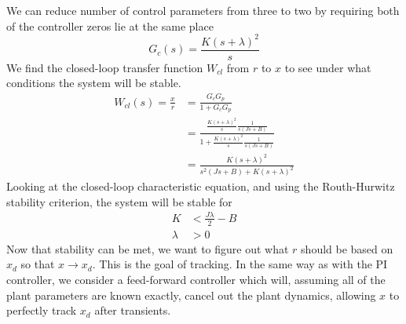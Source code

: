 We can reduce number of control parameters from three to two by requiring both of the controller zeros lie at the same place
\begin{equation*}
  G_{c}(s)=\frac{K(s+\lambda)^{2}}{s}
\end{equation*}
We find the closed-loop transfer function $W_{cl}$ from $r$ to $x$ to see under what conditions the system will be stable.
\begin{align*}
  W_{cl}(s)=\frac{x}{r}&=\frac{G_{c}G_{p}}{1+G_{c}G_{p}} \\
  &=\frac{\frac{K(s+\lambda)^{2}}{s}\frac{1}{s(Js+B)}}{1+\frac{K(s+\lambda)^{2}}{s}\frac{1}{s(Js+B)}} \\
  &=\frac{K(s+\lambda)^{2}}{s^{2}(Js+B)+K(s+\lambda)^{2}}
\end{align*}
Looking at the closed-loop characteristic equation, and using the Routh-Hurwitz stability criterion, the system will be stable for
\begin{align*}
  K&<\frac{J\lambda}{2}-B \\
  \lambda&>0
\end{align*}
Now that stability can be met, we want to figure out what $r$ should be based on $x_{d}$ so that $x\rightarrow x_{d}$.
This is the goal of tracking.
In the same way as with the PI controller, we consider a feed-forward controller which will, assuming all of the plant parameters are known exactly, cancel out the plant dynamics, allowing $x$ to perfectly track $x_{d}$ after transients.

\begin{figure}[H]
  \begin{center}
  \end{center}
\end{figure}

